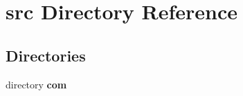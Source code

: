 \section{src Directory Reference}
\label{dir_75069adf26a66624617c89014ec1b23e}
\subsection*{Directories}
\begin{DoxyCompactItemize}
\item 
directory {\bf com}
\end{DoxyCompactItemize}
